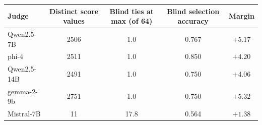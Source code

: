 \begin{tabular}{lcccc}
\toprule
Judge & Distinct score values & Blind ties at max (of 64) & Blind selection accuracy & Margin \\
\midrule
Qwen2.5-7B & 2506 & 1.0 & 0.767 & $+5.17$ \\
phi-4 & 2511 & 1.0 & 0.850 & $+4.20$ \\
Qwen2.5-14B & 2491 & 1.0 & 0.750 & $+4.06$ \\
gemma-2-9b & 2751 & 1.0 & 0.750 & $+5.32$ \\
Mistral-7B & 11 & 17.8 & 0.564 & $+1.38$ \\
\bottomrule
\end{tabular}
